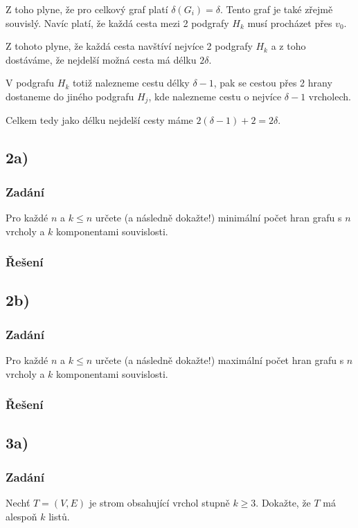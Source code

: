 \documentclass[../main.tex]{subfiles}
\begin{document}
Z toho plyne, že pro celkový graf platí $\delta(G_i) = \delta$. Tento graf je také zřejmě souvislý. 
Navíc platí, že každá cesta mezi 2 podgrafy $H_k$ musí procházet přes $v_0$.

Z tohoto plyne, že každá cesta navštíví nejvíce 2 podgrafy $H_k$ a 
z toho dostáváme, že nejdelší možná cesta má délku $2\delta$.

V podgrafu $H_k$ totiž nalezneme cestu délky $\delta -1$, pak se cestou přes 2 hrany dostaneme do jiného podgrafu $H_j$, kde nalezneme cestu o nejvíce $\delta-1$ vrcholech.

Celkem tedy jako délku nejdelší cesty máme $2( \delta - 1) + 2 = 2\delta$. 



\subsection{2a)}
\subsubsection*{Zadání}
Pro každé $n$ a $k\leq n$ určete (a následně dokažte!) minimální počet hran grafu
s $n$ vrcholy a $k$ komponentami souvislosti.

\subsubsection*{Řešení}




\subsection{2b)}
\subsubsection*{Zadání}
Pro každé $n$ a $k\leq n$ určete (a následně dokažte!) maximální počet hran grafu
s $n$ vrcholy a $k$ komponentami souvislosti.


\subsubsection*{Řešení}

\subsection{3a)}
\subsubsection*{Zadání}
Nechť $T=(V,E)$ je strom obsahující vrchol stupně $k\geq 3$.
Dokažte, že $T$ má alespoň $k$ listů.
\end{document}
